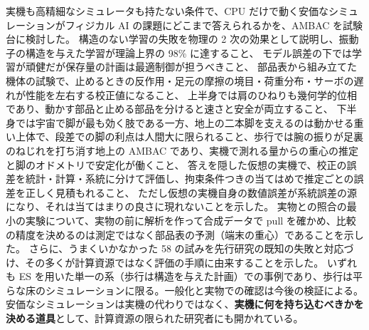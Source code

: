 \documentclass[paper=a4paper,fontsize=10pt,twocolumn,column_gap=2zw,line_length=24zw,number_of_lines=46,head_space=20mm]{jlreq}
\begin{document}
実機も高精細なシミュレータも持たない条件で、CPU だけで動く安価なシミュレーションがフィジカル AI の課題にどこまで答えられるかを、AMBAC を試験台に検討した。
構造のない学習の失敗を物理の 2 次の効果として説明し、振動子の構造を与えた学習が理論上界の 98\% に達すること、
モデル誤差の下では学習が頑健だが保存量の計画は最適制御が担うべきこと、
部品表から組み立てた機体の試験で、止めるときの反作用・足元の摩擦の境目・荷重分布・サーボの遅れが性能を左右する校正値になること、
上半身では肩のひねりも幾何学的位相であり、動かす部品と止める部品を分けると速さと安全が両立すること、
下半身では宇宙で脚が最も効く肢である一方、地上の二本脚を支えるのは動かせる重い上体で、段差での脚の利点は人間大に限られること、歩行では腕の振りが足裏のねじれを打ち消す地上の AMBAC であり、実機で測れる量からの重心の推定と脚のオドメトリで安定化が働くこと、
答えを隠した仮想の実機で、校正の誤差を統計・計算・系統に分けて評価し、拘束条件つきの当てはめで推定ごとの誤差を正しく見積もれること、
ただし仮想の実機自身の数値誤差が系統誤差の源になり、それは当てはまりの良さに現れないことを示した。
実物との照合の最小の実験について、実物の前に解析を作って合成データで pull を確かめ、比較の精度を決めるのは測定ではなく部品表の予測（端末の重心）であることを示した。
さらに、うまくいかなかった 58 の試みを先行研究の既知の失敗と対応づけ、その多くが計算資源ではなく評価の手順に由来することを示した。
いずれも ES を用いた単一の系（歩行は構造を与えた計画）での事例であり、歩行は平らな床のシミュレーションに限る。一般化と実物での確認は今後の検証による。
安価なシミュレーションは実機の代わりではなく、\textbf{実機に何を持ち込むべきかを決める道具}として、計算資源の限られた研究者にも開かれている。

\appendix
\end{document}
